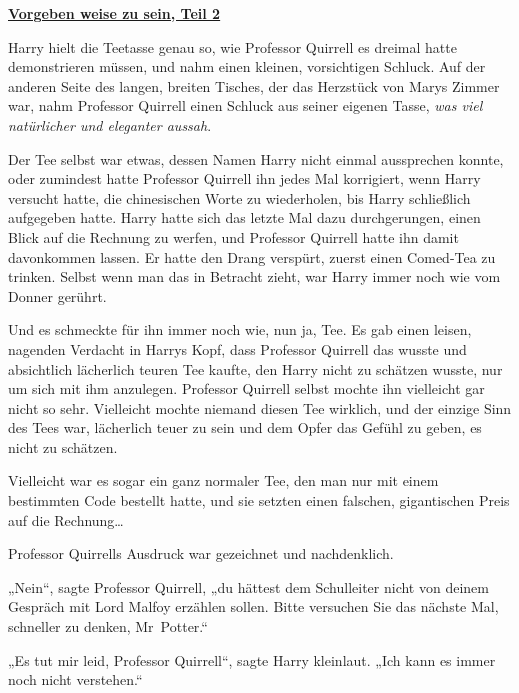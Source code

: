 

\hypertarget{vorgeben-weise-zu-sein-teil-2}{%

\textbf{\uline{Vorgeben weise zu sein, Teil 2}}

Harry hielt die Teetasse genau so, wie Professor Quirrell es dreimal hatte demonstrieren müssen, und nahm einen kleinen, vorsichtigen Schluck. Auf der anderen Seite des langen, breiten Tisches, der das Herzstück von Marys Zimmer war, nahm Professor Quirrell einen Schluck aus seiner eigenen Tasse, \emph{was viel natürlicher und eleganter aussah}.

Der Tee selbst war etwas, dessen Namen Harry nicht einmal aussprechen konnte, oder zumindest hatte Professor Quirrell ihn jedes Mal korrigiert, wenn Harry versucht hatte, die chinesischen Worte zu wiederholen, bis Harry schließlich aufgegeben hatte. Harry hatte sich das letzte Mal dazu durchgerungen, einen Blick auf die Rechnung zu werfen, und Professor Quirrell hatte ihn damit davonkommen lassen. Er hatte den Drang verspürt, zuerst einen Comed-Tea zu trinken. Selbst wenn man das in Betracht zieht, war Harry immer noch wie vom Donner gerührt.

Und es schmeckte für ihn immer noch wie, nun ja, Tee. Es gab einen leisen, nagenden Verdacht in Harrys Kopf, dass Professor Quirrell das wusste und absichtlich lächerlich teuren Tee kaufte, den Harry nicht zu schätzen wusste, nur um sich mit ihm anzulegen. Professor Quirrell selbst mochte ihn vielleicht gar nicht so sehr. Vielleicht mochte niemand diesen Tee wirklich, und der einzige Sinn des Tees war, lächerlich teuer zu sein und dem Opfer das Gefühl zu geben, es nicht zu schätzen.

Vielleicht war es sogar ein ganz normaler Tee, den man nur mit einem bestimmten Code bestellt hatte, und sie setzten einen falschen, gigantischen Preis auf die Rechnung…

Professor Quirrells Ausdruck war gezeichnet und nachdenklich.

„Nein“, sagte Professor Quirrell, „du hättest dem Schulleiter nicht von deinem Gespräch mit Lord Malfoy erzählen sollen. Bitte versuchen Sie das nächste Mal, schneller zu denken, Mr~Potter.“

„Es tut mir leid, Professor Quirrell“, sagte Harry kleinlaut. „Ich kann es immer noch nicht verstehen.“

}
